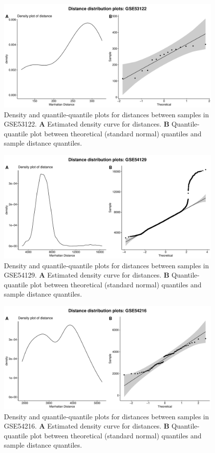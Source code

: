 \documentclass[10pt,letterpaper]{article}\usepackage[]{graphicx}\usepackage[]{color}
\begin{document}
\begin{figure}[H]
	\includegraphics[width=\textwidth]{manhattan-distance_hist_GSE53122.pdf}
	\caption{Density and quantile-quantile plots for distances between samples in GSE53122. \textbf{A} Estimated density curve for distances. \textbf{B} Quantile-quantile plot between theoretical (standard normal) quantiles and sample distance quantiles.}
\end{figure}

\begin{figure}[H]
	\includegraphics[width=\textwidth]{manhattan-distance_hist_GSE54129.pdf}
	\caption{Density and quantile-quantile plots for distances between samples in GSE54129. \textbf{A} Estimated density curve for distances. \textbf{B} Quantile-quantile plot between theoretical (standard normal) quantiles and sample distance quantiles.}
\end{figure}

\begin{figure}[H]
	\includegraphics[width=\textwidth]{manhattan-distance_hist_GSE54216.pdf}
	\caption{Density and quantile-quantile plots for distances between samples in GSE54216. \textbf{A} Estimated density curve for distances. \textbf{B} Quantile-quantile plot between theoretical (standard normal) quantiles and sample distance quantiles.}
\end{figure}
\end{document}

